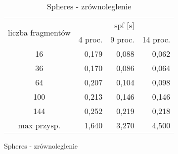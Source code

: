 \begin{figure}[H]
\begin{longtable}{|c|r|r|r|} 
		\caption{Spheres - zrównoleglenie}\label{sph} \\ \hline
	    \multirow{2}{*}{liczba fragmentów} & \multicolumn{3}{|c|}{spf [s]} \\ \cline{2-4}
	 	& 4 proc. & 9 proc. & 14 proc. \\ \hline
	    16 & 0,179 & 0,088 & 0,062 \\ 
	    36 & 0,170 & 0,086 & 0,064 \\
		64 & 0,207 & 0,104 & 0,098 \\
		100 & 0,213 & 0,146 & 0,146 \\
		144 & 0,252 & 0,219 & 0,218 \\ \hline
		max przysp. & 1,640 & 3,270 & 4,500 \\
		\hline
\end{longtable}
\end{figure}

